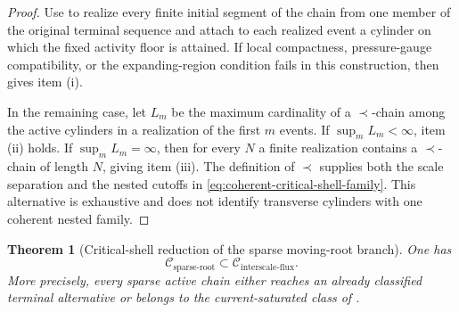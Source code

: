 \documentclass[11pt]{amsart}
\numberwithin{equation}{section}
\theoremstyle{plain}
\newtheorem{theorem}{Theorem}[section]
\theoremstyle{definition}
\theoremstyle{remark}
\newcommand{\Csparse}{\mathcal C_{\mathrm{sparse\text{-}root}}}
\newcommand{\Cisf}{\mathcal C_{\mathrm{interscale\text{-}flux}}}
\begin{document}
\begin{proof}
Use  to realize every finite initial
segment of the chain from one member of the original terminal sequence and
attach to each realized event a cylinder on which the fixed activity floor is
attained.  If local compactness, pressure-gauge compatibility, or the
expanding-region condition fails in this construction, then
gives item \textup{(i)}.

In the remaining case, let \(L_m\) be the maximum cardinality of a
\(\prec\)-chain among the active cylinders in a realization of the first
\(m\) events.  If \(\sup_mL_m<\infty\), item \textup{(ii)} holds.  If
\(\sup_mL_m=\infty\), then for every \(N\) a finite realization contains a
\(\prec\)-chain of length \(N\), giving item \textup{(iii)}.  The definition
of \(\prec\) supplies both the scale separation and the nested cutoffs in
\eqref{eq:coherent-critical-shell-family}.  This alternative is exhaustive
and does not identify transverse cylinders with one coherent nested family.
\end{proof}

\begin{theorem}[Critical-shell reduction of the sparse moving-root branch]
\label{thm:sparse-moving-root-current-exclusion}
One has
\begin{equation}\label{eq:sparse-to-interscale-flux}
 \Csparse\subset\Cisf .
\end{equation}
More precisely, every sparse active chain either reaches an already classified
terminal alternative or belongs to the current-saturated class of
.
\end{theorem}
\end{document}
